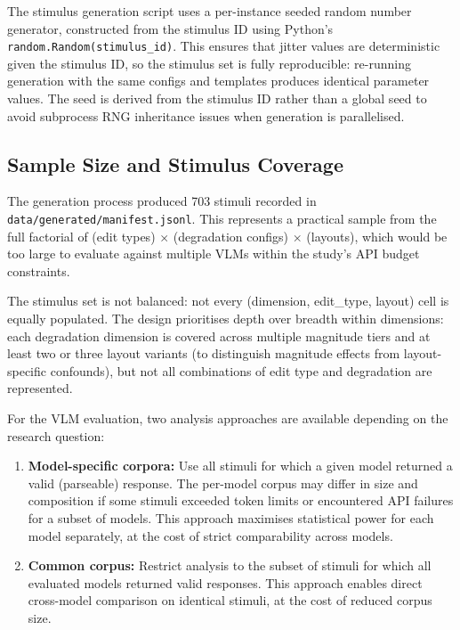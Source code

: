 The stimulus generation script uses a per-instance seeded random number generator, constructed from the stimulus ID using Python's \texttt{random.Random(stimulus\_id)}. This ensures that jitter values are deterministic given the stimulus ID, so the stimulus set is fully reproducible: re-running generation with the same configs and templates produces identical parameter values. The seed is derived from the stimulus ID rather than a global seed to avoid subprocess RNG inheritance issues when generation is parallelised.

\subsection{Sample Size and Stimulus Coverage} \label{Sample Size}

The generation process produced 703 stimuli recorded in \texttt{data/generated/manifest.jsonl}. This represents a practical sample from the full factorial of (edit types) $\times$ (degradation configs) $\times$ (layouts), which would be too large to evaluate against multiple VLMs within the study's API budget constraints.

The stimulus set is not balanced: not every (dimension, edit\_type, layout) cell is equally populated. The design prioritises depth over breadth within dimensions: each degradation dimension is covered across multiple magnitude tiers and at least two or three layout variants (to distinguish magnitude effects from layout-specific confounds), but not all combinations of edit type and degradation are represented.

For the VLM evaluation, two analysis approaches are available depending on the research question:

\begin{enumerate}
    \item \textbf{Model-specific corpora:} Use all stimuli for which a given model returned a valid (parseable) response. The per-model corpus may differ in size and composition if some stimuli exceeded token limits or encountered API failures for a subset of models. This approach maximises statistical power for each model separately, at the cost of strict comparability across models.
    \item \textbf{Common corpus:} Restrict analysis to the subset of stimuli for which all evaluated models returned valid responses. This approach enables direct cross-model comparison on identical stimuli, at the cost of reduced corpus size.
\end{enumerate}

